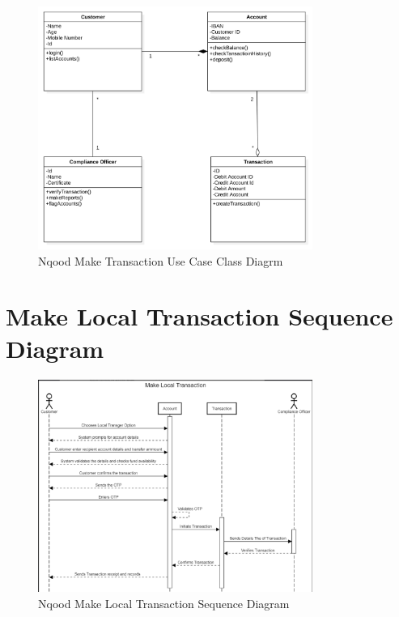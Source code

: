 \documentclass[a4paper]{report}
\begin{document}
\begin{figure}[h!]
    \centering
    \includegraphics[width=0.8\textwidth]{images/nqood-make-tx-use-case-class-diagram.png}
    \caption{Nqood Make Transaction Use Case Class Diagrm}
    \label{fig:nqood-make-transaction-use-case-class-diagram}
\end{figure}

\section{Make Local Transaction Sequence Diagram}

\begin{figure}[h!]
    \centering
    \includegraphics[width=0.8\textwidth]{images/nqood-make-local-tx-sequence-diagram.png}
    \caption{Nqood Make Local Transaction Sequence Diagram}
    \label{fig:nqood-make-local-transaction-sequence-diagram}
\end{figure}
\end{document}
